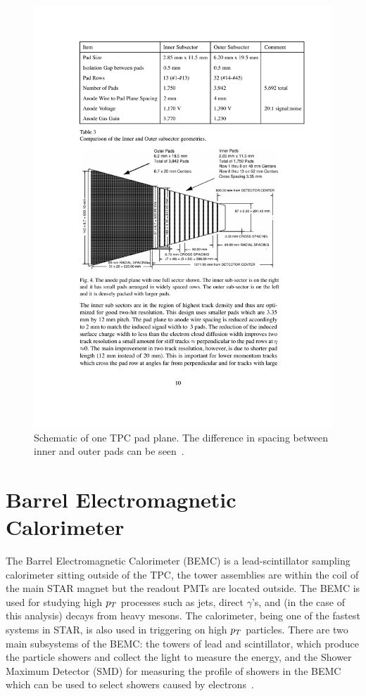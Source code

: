 \begin{figure}[htbp]
\begin{center}
\includegraphics[scale=1.0]{Plots/Detector/TPC_pad.pdf}
\end{center}
\caption[TPC Sector]{Schematic of one TPC pad plane. The difference in spacing between inner and outer pads can be seen~\cite{tpcNIM}.}
\label{fig:TPC_pad}
\end{figure}

\section{Barrel Electromagnetic Calorimeter}

The Barrel Electromagnetic Calorimeter (BEMC) is a lead-scintillator sampling calorimeter sitting outside of the TPC, the tower assemblies are within the coil of the main STAR magnet but the readout PMTs are located outside. The BEMC is used for studying high $p_{T}$ processes such as jets, direct $\gamma$'s, and (in the case of this analysis) decays from heavy mesons. The calorimeter, being one of the fastest systems in STAR, is also used in triggering on high $p_{T}$ particles. There are two main subsystems of the BEMC: the towers of lead and scintillator, which produce the particle showers and collect the light to measure the energy, and the Shower Maximum Detector (SMD) for measuring the profile of showers in the BEMC which can be used to select showers caused by electrons~\cite{emcNIM}.

